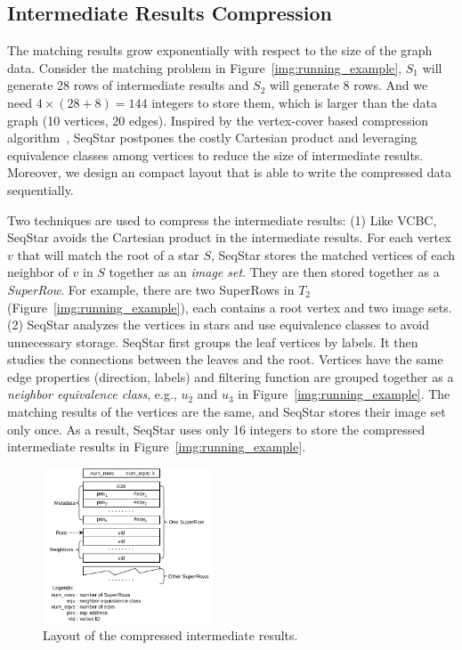 \subsection{Intermediate Results Compression}\label{sec:match_compress}
The matching results grow exponentially with respect to the size of the graph data.
Consider the matching problem in Figure~\ref{img:running_example},
$S_1$ will generate 28 rows of intermediate results and $S_2$ will generate 8 rows.
And we need $4 \times (28 + 8) = 144$ integers to store them, which is larger than the data graph (10 vertices, 20 edges).
Inspired by the vertex-cover based compression algorithm~\cite{DBLP:journals/pvldb/QiaoZC17},
SeqStar postpones the costly Cartesian product and leveraging equivalence classes among vertices to reduce the size of intermediate results.
Moreover, we design an compact layout that is able to write the compressed data sequentially.

Two techniques are used to compress the intermediate results:
(1) Like VCBC, SeqStar avoids the Cartesian product in the intermediate results.
For each vertex $v$ that will match the root of a star $S$,
SeqStar stores the matched vertices of each neighbor of $v$ in $S$ together as an \emph{image set}.
They are then stored together as a \emph{SuperRow}.
For example, there are two SuperRows in $T_2$ (Figure~\ref{img:running_example}),
each contains a root vertex and two image sets.
(2) SeqStar analyzes the vertices in stars and use equivalence classes to avoid unnecessary storage.
SeqStar first groups the leaf vertices by labels.
It then studies the connections between the leaves and the root.
Vertices have the same edge properties (direction, labels) and filtering function are grouped together as a \emph{neighbor equivalence class},
e.g., $u_2$ and $u_3$ in Figure~\ref{img:running_example}.
The matching results of the vertices are the same, and SeqStar stores their image set only once.
As a result, SeqStar uses only 16 integers to store the compressed intermediate results in Figure~\ref{img:running_example}.
\begin{figure}[ht]
  \centering
  \includegraphics[width=0.45\textwidth]{img/compress.pdf}
  \caption{Layout of the compressed intermediate results.}\label{img:compress}
\end{figure}

